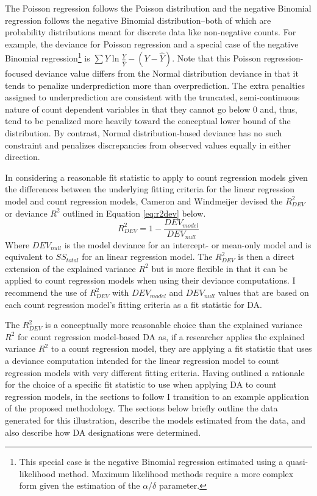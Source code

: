 \documentclass[man]{apa7}
\begin{document}
	The Poisson regression follows the Poisson distribution and the negative Binomial regression follows the negative Binomial distribution--both of which are probability distributions meant for discrete data like non-negative counts.
	For example, the deviance for Poisson regression and a special case of the negative Binomial regression\footnote{
		This special case is the negative Binomial regression estimated using a quasi-likelihood method. 
		Maximum likelihood methods require a more complex form given the estimation of the $\alpha$/$\delta$ parameter.} 
	is $\sum Y\ln \frac{Y}{\hat{Y}} - (Y - \hat{Y})$. 
	Note that this Poisson regression-focused deviance value differs from the Normal distribution deviance in that it tends to penalize underprediction more than overprediction.
	The extra penalties assigned to underprediction are consistent with the truncated, semi-continuous nature of count dependent variables in that they cannot go below 0 and, thus, tend to be penalized more heavily toward the conceptual lower bound of the distribution.
	By contrast, Normal distribution-based deviance has no such constraint and penalizes discrepancies from observed values equally in either direction.
	
	In considering a reasonable fit statistic to apply to count regression models given the differences between the underlying fitting criteria for the linear regression model and count regression models, Cameron and Windmeijer \parencite*{cameron1996r} devised the $R^2_{DEV}$ or deviance $R^2$ outlined in Equation \ref{eq:r2dev} below.
	\begin{equation}
		R^{2}_{DEV} = 1 - \frac{DEV_{model}}{DEV_{null}}
		\label{eq:r2dev}
	\end{equation}
	Where $DEV_{null}$ is the model deviance for an intercept- or mean-only model and is equivalent to $SS_{total}$ for an linear regression model.
	The $R^2_{DEV}$ is then a direct extension of the explained variance $R^2$ but is more flexible in that it can be applied to count regression models when using their deviance computations.
	I recommend the use of $R^2_{DEV}$ with $DEV_{model}$ and $DEV_{null}$ values that are based on each count regression model's fitting criteria as a fit statistic for DA.
	
	The $R^2_{DEV}$ is a conceptually more reasonable choice than the explained variance $R^2$ for count regression model-based DA as, if a researcher applies the explained variance $R^2$ to a count regression model, they are applying a fit statistic that uses a deviance computation intended for the linear regression model to count regression models with very different fitting criteria. 
	Having outlined a rationale for the choice of a specific fit statistic to use when applying DA to count regression models, in the sections to follow I transition to an example application of the proposed methodology.
	The sections below briefly outline the data generated for this illustration, describe the models estimated from the data, and also describe how DA designations were determined.
	
\end{document}
